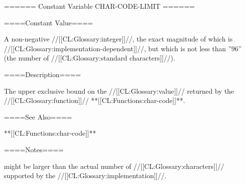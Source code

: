 ====== Constant Variable CHAR-CODE-LIMIT ======

====Constant Value====

A non-negative //[[CL:Glossary:integer]]//, the exact magnitude of which is //[[CL:Glossary:implementation-dependent]]//, but which is not less than ''96'' (the number of //[[CL:Glossary:standard characters]]//).

====Description====

The upper exclusive bound on the //[[CL:Glossary:value]]// returned by the //[[CL:Glossary:function]]// **[[CL:Functions:char-code]]**.

====See Also====

**[[CL:Functions:char-code]]**

====Notes====

 might be larger than the actual number of //[[CL:Glossary:characters]]// supported by the //[[CL:Glossary:implementation]]//.

